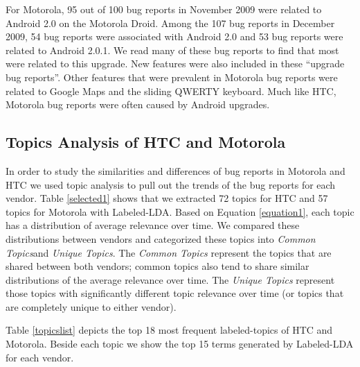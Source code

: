 \documentclass[10pt, conference, compsocconf]{IEEEtran}
\begin{document}
For Motorola,  95 out of 100 bug
reports in November 2009 were related to Android 2.0 on the Motorola Droid.
Among the 107 bug reports in December 2009, 54 bug reports were
associated with Android 2.0 and 53 bug reports were related to Android
2.0.1. 
We read many of these bug reports to find that most were related to this upgrade.
New features were also included in these ``upgrade bug reports''.
Other features that were prevalent in Motorola bug reports were
related to Google Maps and the sliding QWERTY keyboard. 
Much like HTC, Motorola bug reports were often caused by Android upgrades.


\subsection{Topics Analysis of HTC and Motorola}

In order to study the similarities and differences of bug reports in
Motorola and HTC we used topic analysis to pull out the trends of the
bug reports for each vendor.
Table \ref{selected1} shows that we extracted 72 topics for HTC and
57 topics for Motorola with Labeled-LDA.
Based on Equation \ref{equation1}, each topic has a distribution of
average relevance over time. 
We compared these distributions between vendors and categorized these
topics
into 
\textit{Common Topics}and \textit{Unique Topics}.
The \textit{Common Topics} represent the topics that are shared
between both vendors; common topics also tend to share 
similar distributions of the average relevance over
time.
The \textit{Unique Topics} represent those topics with significantly
different topic relevance over time (or topics that are completely
unique to either vendor).



Table \ref{topicslist} depicts 
the top 18 most frequent labeled-topics of HTC and
Motorola.
Beside each topic we show the top 15 terms generated by Labeled-LDA for
each vendor. 
\end{document}
